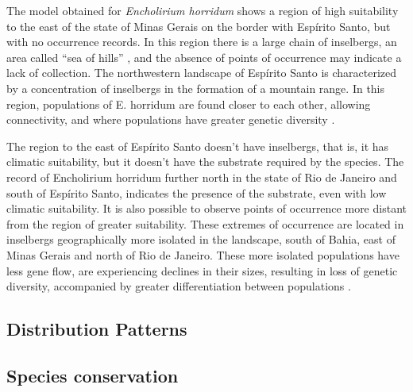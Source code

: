 The model obtained for \textit{Encholirium horridum} shows a region of high suitability to the east of the state of Minas Gerais on the border with Espírito Santo, but with no occurrence records. In this region there is a large chain of inselbergs, an area called “sea of hills” \citep{absaber1967DominiosMorfoclimaticosProvincias}, and the absence of points of occurrence may indicate a lack of collection. The northwestern landscape of Espírito Santo is characterized by a concentration of inselbergs in the formation of a mountain range. In this region, populations of E. horridum are found closer to each other, allowing connectivity, and where populations have greater genetic diversity \citep{hmeljevski2017PlantPopulationsDistinct}. 

The region to the east of Espírito Santo doesn't have inselbergs, that is, it has climatic suitability, but it doesn't have the substrate required by the species. The record of Encholirium horridum further north in the state of Rio de Janeiro and south of Espírito Santo, indicates the presence of the substrate, even with low climatic suitability. It is also possible to observe points of occurrence more distant from the region of greater suitability. These extremes of occurrence are located in inselbergs geographically more isolated in the landscape, south of Bahia, east of Minas Gerais and north of Rio de Janeiro. These more isolated populations have less gene flow, are experiencing declines in their sizes, resulting in loss of genetic diversity, accompanied by greater differentiation between populations \citep{hmeljevski2017PlantPopulationsDistinct}.

\subsection{Distribution Patterns}

\subsection{Species conservation}



